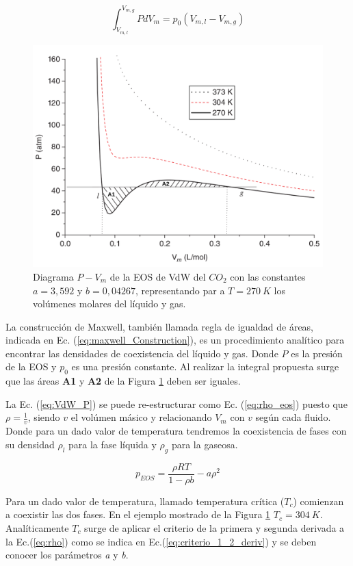\begin{equation}
\int_{V_{m,l}}^{V_{m,g}} P d V_m = p_0 (V_{m,l} -  V_{m,g})
\label{eq:maxwell_Construction}
\end{equation}

\begin{figure}[htbp]
	\centering
	\includegraphics[width=.8\textwidth]{figs/cap4/Diagrama_P_V_del_CO2_Multiphase_LBM}
	\caption{Diagrama $P - V_m$ de la EOS de VdW del $CO_2$ con las constantes $a = 3,592$ y $b = 0,04267$, representando par a $T = 270 \> K$ los volúmenes molares del líquido y gas. \cite{huang2015multiphase}}
	\label{fig:P_V_CO2}	
\end{figure}

La construcción de Maxwell, también llamada regla de igualdad de áreas, indicada en Ec. (\ref{eq:maxwell_Construction}), es un procedimiento analítico para encontrar las densidades de coexistencia del líquido y gas. Donde $P$ es la presión de la EOS y $p_0$ es una presión constante. Al realizar la integral propuesta surge que las áreas \textbf{A1} y \textbf{A2} de la Figura \ref{fig:P_V_CO2} deben ser iguales.

La Ec. (\ref{eq:VdW_P}) se puede re-estructurar como Ec. (\ref{eq:rho_eos}) puesto que $\rho = \frac{1}{v}$, siendo $v$ el volúmen másico y relacionando $V_m$ con $v$ según cada fluido. Donde para un dado valor de temperatura tendremos la coexistencia de fases con su densidad $\rho_l$ para la fase líquida y $\rho_g$ para la gaseosa.

\begin{equation*}
p_{EOS} = \frac{\rho R T}{1- \rho b} - a {\rho}^{2} \nonumber 
\end{equation*}

Para un dado valor de temperatura, llamado temperatura crítica (\textit{$T_c$}) comienzan a coexistir las dos fases. En el ejemplo mostrado de la Figura \ref{fig:P_V_CO2} $T_c = 304 \> K$. Analíticamente $T_c$ surge de aplicar el criterio de la primera y segunda derivada a la Ec.(\ref{eq:rho}) como se indica en Ec.(\ref{eq:criterio_1_2_deriv}) y se deben conocer los parámetros \textit{a} y \textit{b}.

